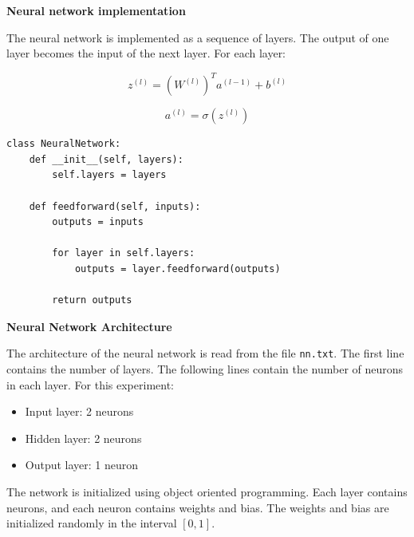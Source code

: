 \documentclass{article}
\begin{document}
\textbf{Neural network implementation}

The neural network is implemented as a sequence of layers.
The output of one layer becomes the input of the next layer. For each layer:

\[
z^{(l)} = (W^{(l)})^T a^{(l-1)} + b^{(l)}
\]

\[
a^{(l)} = \sigma(z^{(l)})
\]

\begin{verbatim}
class NeuralNetwork:            
    def __init__(self, layers):
        self.layers = layers
    
    def feedforward(self, inputs):
        outputs = inputs
        
        for layer in self.layers:
            outputs = layer.feedforward(outputs)
        
        return outputs
\end{verbatim}

\textbf{Neural Network Architecture}

The architecture of the neural network is read from the file
\texttt{nn.txt}. The first line contains the number of layers.
The following lines contain the number of neurons in each layer. For this experiment:

\begin{itemize}
    \item Input layer: 2 neurons
    \item Hidden layer: 2 neurons
    \item Output layer: 1 neuron
\end{itemize}





The network is initialized using object oriented programming.
Each layer contains neurons, and each neuron contains weights and bias.
The weights and bias are initialized randomly in the interval \([0,1]\).
\end{document}
